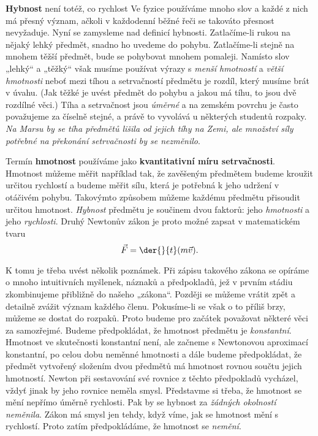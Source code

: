     \textbf{Hybnost} není totéž, co rychlost Ve fyzice používáme mnoho slov a každé z nich má 
    přesný význam, ačkoli v každodenní běžné řeči se takováto přesnost nevyžaduje. Nyní se 
    zamysleme nad definicí hybnosti. Zatlačíme-li rukou na nějaký lehký předmět, snadno ho uvedeme 
    do pohybu. Zatlačíme-li stejně na mnohem těžší předmět, bude se pohybovat mnohem pomaleji. 
    Namísto slov „lehký“ a „těžký“ však musíme používat výrazy s \emph{menší hmotností} a 
    \emph{větší hmotnosti} neboť mezi tíhou a setrvačností předmětu je rozdíl, který musíme brát v 
    úvahu. (Jak těžké je uvést předmět do pohybu a jakou má tíhu, to jsou dvě rozdílné věci.) Tíha 
    a setrvačnost jsou \emph{úměrné} a na zemském povrchu je často považujeme za číselně stejné, a 
    právě to vyvolává u některých studentů rozpaky. \emph{Na Marsu by se tíha předmětů lišila od 
    jejich tíhy na Zemi, ale množství síly potřebné na překonání setrvačnosti by se nezměnilo}.
    
    Termín \textbf{hmotnost} používáme jako \textbf{kvantitativní míru setrvačnosti}. Hmotnost 
    můžeme měřit například tak, že zavěšeným předmětem budeme kroužit určitou rychlostí a budeme 
    měřit sílu, která je potřebná k jeho udržení v otáčivém pohybu. Takovýmto způsobem můžeme 
    každému předmětu přisoudit určitou hmotnost. \emph{Hybnost} předmětu je součinem dvou faktorů: 
    jeho \emph{hmotnosti} a jeho \emph{rychlosti}. Druhý Newtonův zákon je proto možné zapsat v 
    matematickém tvaru
    \begin{equation}\label{fyz:eq052}
      \vec{F} = \der{}{t}(m\vec{v}).
    \end{equation}
    
    K tomu je třeba uvést několik poznámek. Při zápisu takového zákona se opíráme o mnoho 
    intuitivních myšlenek, náznaků a předpokladů, jež v prvním stádiu zkombinujeme přibližně do 
    našeho „zákona“. Později se můžeme vrátit zpět a detailně zvážit význam každého členu. 
    Pokusíme-li se však o to příliš brzy, můžeme se dostat do rozpaků. Proto budeme pro začátek 
    považovat některé věci za samozřejmé. Budeme předpokládat, že hmotnost předmětu je 
    \emph{konstantní}. Hmotnost ve skutečnosti konstantní není, ale začneme s Newtonovou aproximací 
    konstantní, po celou dobu neměnné hmotnosti a dále budeme předpokládat, že předmět vytvořený 
    složením dvou předmětů má hmotnost rovnou součtu jejich hmotností. Newton při sestavování své 
    rovnice z těchto předpokladů vycházel, vždyť jinak by jeho rovnice neměla smysl. Představme si 
    třeba, že hmotnost se mění nepřímo úměrně rychlosti. Pak by se hybnost za \emph{žádných 
    okolností neměnila}. Zákon má smysl jen tehdy, když víme, jak se hmotnost mění s rychlostí. 
    Proto zatím předpokládáme, že hmotnost se \emph{nemění}.
    
